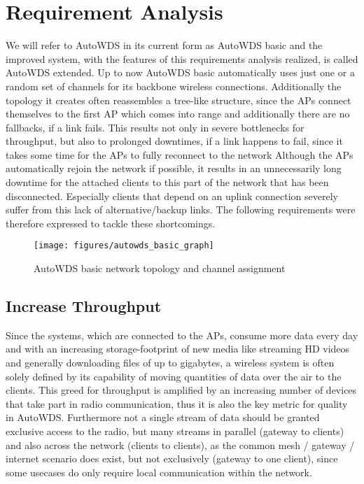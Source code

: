 \chapter{Requirement Analysis}
  \label{reqana}
  We will refer to AutoWDS in its current form as AutoWDS basic and the improved system, with the features of this requirements analysis realized, 
  is called AutoWDS extended.
  Up to now AutoWDS basic automatically uses just one or a random set of channels for its backbone wireless connections. 
  Additionally the topology it creates often reassembles a tree-like structure, since the APs connect themselves 
  to the first \ac{AP} which comes into range and additionally there are no fallbacks, if a link fails. 
  This results not only in severe bottlenecks for throughput, but also to prolonged downtimes, if a link happens to fail, since
  it takes some time for the APs to fully reconnect to the network Although the APs automatically rejoin the network if possible, 
  it results in an unnecessarily long downtime for the attached clients to this part of the network that has been disconnected. 
  Especially clients that depend on an uplink connection severely suffer from this lack of alternative/backup links. 
  The following requirements were therefore expressed to tackle these shortcomings.
  
  \begin{figure}[h!]
    \centering
    \texttt{[image: figures/autowds\_basic\_graph]}
    \caption{AutoWDS basic network topology and channel assignment}
    \label{fig:autowds_basic_graph}
  \end{figure}

  \section{Increase Throughput}
  \label{reqincreasethroughput}
  Since the systems, which are connected to the APs, consume more data every day and with an increasing storage-footprint of new media like streaming \ac{HD} videos
  and generally downloading files of up to gigabytes, a wireless system is often solely defined by its capability of moving quantities of data over the air to the clients.
  This greed for throughput is amplified by an increasing number of devices that take part in radio communication, 
  thus it is also the key metric for quality in AutoWDS. 
  Furthermore not a single stream of data should be granted exclusive access to the radio, but
  many streams in parallel (gateway to clients) and also across the network (clients to clients), 
  as the common mesh / gateway / internet scenario does exist, but not exclusively (gateway to one client),
  since some usecases do only require local communication within the network.
  
